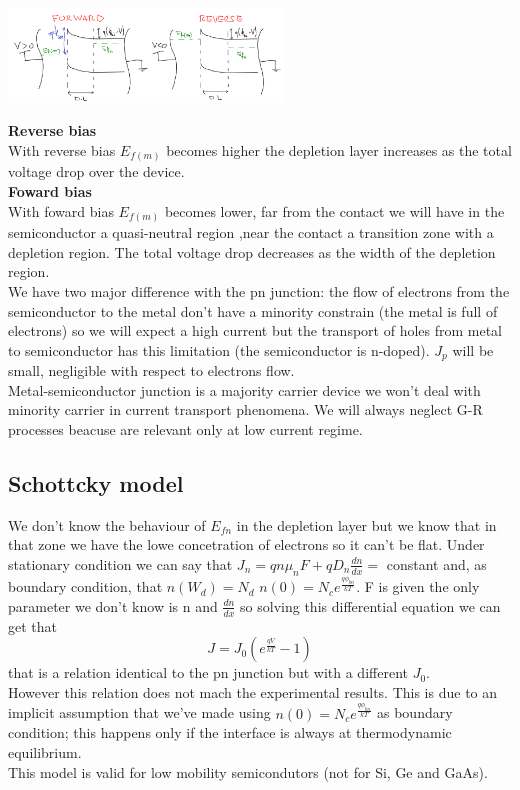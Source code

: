 \centering
\includegraphics[width=0.55\textwidth]{msbias.png}\\
\raggedright


{\bf Reverse bias}\\
With reverse bias $E_{f(m)}$ becomes higher the depletion layer increases as the total voltage drop over the device.\\ 
{\bf Foward bias}\\
With foward bias $E_{f(m)}$ becomes lower, far from the contact we will have in the semiconductor a quasi-neutral region ,near the contact a transition zone with a depletion region. The total voltage drop decreases as the width of the depletion region.\\
We have two major difference with the pn junction: the flow of electrons from the semiconductor to the metal  don't have a minority constrain (the metal is full of electrons) so we will expect a high current but the transport of holes from metal to semiconductor has this limitation (the semiconductor is n-doped). $J_p$ will be small, negligible with respect to electrons flow.\\
Metal-semiconductor junction is a majority carrier device we won't deal with minority carrier in current transport phenomena. We will always neglect G-R processes beacuse are relevant only at low current regime.\\

\subsection{Schottcky model}
We don't know the behaviour of $E_{fn}$ in the depletion layer but we know that in that zone we have the lowe concetration of electrons so it can't be flat. Under stationary condition we can say that $ J_n=qn\mu_nF+qD_n \frac{dn}{dx}=$ constant and, as boundary condition, that $n(W_d)=N_d$ $n(0)=N_ce^{\frac{q\phi_{bn}}{kT}}$. F is given the only parameter we don't know is n and $\frac{dn}{dx}$ so solving this differential equation we can get that
\begin{equation}
J=J_0(e^{\frac{qV}{kT}}-1)
\end{equation}
that is a relation identical to the pn junction but with a different $J_0$.\\
However this relation does not mach the experimental results. This is due to an implicit assumption that we've made using $n(0)=N_ce^{\frac{q\phi_{bn}}{kT}}$ as boundary condition; this happens only if the interface is always at thermodynamic equilibrium.\\
This model is valid for low mobility semicondutors (not for Si, Ge and GaAs).\\

